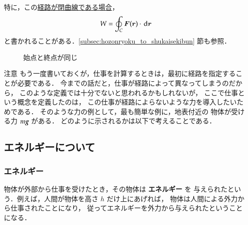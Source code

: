                 特に，この\underline{経路が閉曲線である場合}，
                    \begin{align}
                        W=\oint_{C}\boldsymbol{F}(\boldsymbol{r}) \cdot \,\mathrm{d}\boldsymbol{r}
                    \end{align}
                と書かれることがある．\ref{subsec:hozonryoku_to_shukaisekibun} 節も参照．
                    \begin{figure}[hbt]
                            \begin{center}
                                \caption{始点と終点が同じ}
                                \label{fig:keiro_loop}
                            \end{center}
                    \end{figure}

                \begin{memo}{注意}
                    もう一度書いておくが，仕事を計算するときは，最初に経路を指定することが必要である．
                    今までの話だと，仕事が経路によって異なってしまうのだから，
                    このような定義では十分でないと思われるかもしれないが，
                    ここで仕事という概念を定義したのは，
                    この仕事が経路によらないような力を導入したいためである．
                    そのような力の例として，最も簡単な例に，地表付近の
                    物体が受ける力 $m\textit{\textbf{g}}$ がある．
                    どのように示されるかは以下で考えることである．
                \end{memo}

        \subsection{エネルギーについて}
            \subsubsection{エネルギー}
                物体が外部から仕事を受けたとき，その物体は \textbf{エネルギー} を
                与えられたという．例えば，人間が物体を高さ $h$ だけ上にあげれば，
                物体は人間による外力から仕事されたことになり，
                従ってエネルギーを外力から与えられたということになる．

